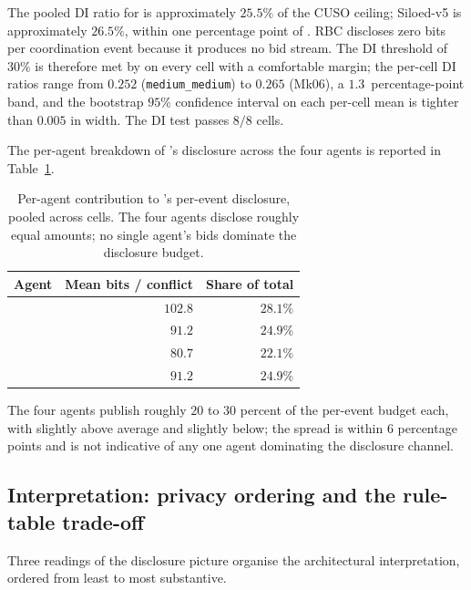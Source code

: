 The pooled DI ratio for \NEXUS{} is approximately $25.5\%$ of the
CUSO ceiling; Siloed-v5 is approximately $26.5\%$, within one
percentage point of \NEXUS{}. RBC discloses zero bits per coordination
event because it produces no bid stream. The DI threshold of
$30\%$ is therefore met by \NEXUS{} on every cell with a comfortable
margin; the per-cell DI ratios range from $0.252$
(\texttt{medium\_medium}) to $0.265$ (Mk06), a $1.3$~percentage-point
band, and the bootstrap $95\%$ confidence interval on each per-cell
mean is tighter than $0.005$ in width. The DI test passes $8/8$
cells.

The per-agent breakdown of \NEXUS{}'s disclosure across the four
agents is reported in Table~\ref{tab:val-disclosure-per-agent}.

\begin{table}[ht]
\centering
\caption{Per-agent contribution to \NEXUS{}'s per-event disclosure,
pooled across cells. The four agents disclose roughly equal
amounts; no single agent's bids dominate the disclosure budget.}
\label{tab:val-disclosure-per-agent}
\small
\begin{tabularx}{\textwidth}{@{}X r r@{}}
\toprule
\textbf{Agent} & \textbf{Mean bits / conflict} & \textbf{Share of \NEXUS{} total} \\
\midrule
\PSA{} & $102.8$ & $28.1\%$ \\
\PMA{} & $\phantom{1}91.2$ & $24.9\%$ \\
\QCA{} & $\phantom{1}80.7$ & $22.1\%$ \\
\SCA{} & $\phantom{1}91.2$ & $24.9\%$ \\
\bottomrule
\end{tabularx}
\end{table}

The four agents publish roughly $20$ to $30$ percent of the per-event
budget each, with \PSA{} slightly above average and \QCA{} slightly
below; the spread is within $6$ percentage points and is not
indicative of any one agent dominating the disclosure channel.

\subsection*{Interpretation: privacy ordering and the rule-table trade-off}

Three readings of the disclosure picture organise the architectural
interpretation, ordered from least to most substantive.

